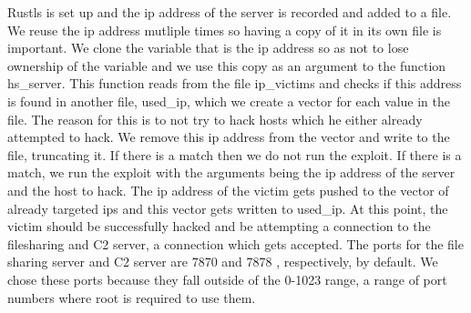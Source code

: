 \documentclass[../main.tex]{subfiles}
\begin{document}
Rustls is set up and the ip address of the server is recorded and added to a file. We reuse the ip address mutliple times so having a copy of it in its own file is important. We clone
the variable that is the ip address so as not to lose ownership of the variable and we use this copy as an argument to the function hs\_server. This function reads from the file 
ip\_victims and checks if this address is found in another file, used\_ip, which we create a vector for each value in the file. The reason for this is to not try to hack hosts which 
he either already attempted to hack. We remove this ip address from the vector and write to the file, truncating it. If there is a match then we do not run the exploit. If there is a
match, we run the exploit with the arguments being the ip address of the server and the host to hack. The ip address of the victim gets pushed to the vector of already targeted ips and
this vector gets written to used\_ip. At this point, the victim should be successfully hacked and be attempting a connection to the filesharing and C2 server, a connection which 
gets accepted. The ports for the file sharing server and C2 server are 7870 and 7878 , respectively, by default. We chose these ports because they fall outside of the 0-1023 range,
a range of port numbers where root is required to use them.

	\vspace{10pt}
\end{document}
